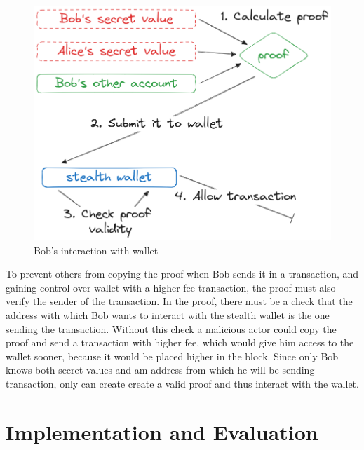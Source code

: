 \documentclass[conference,comsoc,10pt]{IEEEtran}
\begin{document}
    \begin{figure}[h]
        \centering
        \includegraphics[scale=0.25]{./assets/images/interating-with-wallet.png}
        \caption{Bob's interaction with wallet}
        \label{fig:wallet-interaction}
    \end{figure}

    To prevent others from copying the proof when Bob sends it in a transaction,
    and gaining control over wallet with a higher fee transaction, the proof
    must also verify the sender of the transaction. In the proof, there must
    be a check that the address with which Bob wants to interact with the
    stealth wallet is the one sending the transaction. Without this check a malicious
    actor could copy the proof and send a transaction with higher fee, which would
    give him access to the wallet sooner, because it would be placed higher in
    the block. Since only Bob knows both secret values and am address from which
    he will be sending transaction, only can create create a valid proof and thus
    interact with the wallet.

\section{Implementation and Evaluation}
\end{document}

